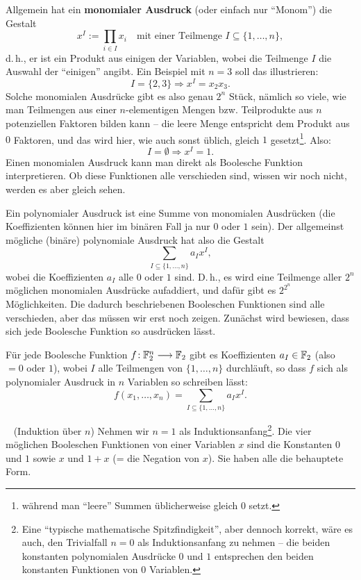 \begin{refsegment}
Allgemein hat ein \textbf{monomialer Ausdruck}
(oder einfach nur "`Monom"') die Gestalt
\[
    x^I := \prod_{i \in I} x_i
     \quad\text{mit einer Teilmenge } I \subseteq \{1, \ldots, n\},
\]
d.\,h., er ist ein Produkt aus einigen der Variablen, wobei die Teilmenge
$I$ die Auswahl der "`einigen"' angibt. Ein Beispiel mit $n = 3$
soll das illustrieren:
\[
      I = \{2, 3\} \Longrightarrow x^I = x_2 x_3.
\]
Solche monomialen
Ausdrücke gibt es also genau $2^n$ Stück, nämlich so viele, wie man
Teilmengen aus einer $n$-elementigen Mengen bzw.
Teilprodukte aus $n$ potenziellen Faktoren bilden kann -- die leere
Menge entspricht dem Produkt aus $0$ Faktoren, und das wird hier, wie
auch sonst üblich, gleich $1$ gesetzt\footnote{%
  während man "`leere"' Summen üblicherweise gleich $0$ setzt.
}.
Also:
\[
      I = \emptyset \Longrightarrow x^I = 1.
\]
Einen monomialen Ausdruck kann man direkt als Boolesche
Funktion
interpretieren. Ob diese Funktionen alle verschieden
sind, wissen wir noch nicht, werden es aber gleich sehen.

Ein polynomialer
Ausdruck ist eine Summe von monomialen Ausdrücken
(die Koeffizienten können hier im binären Fall ja nur $0$ oder $1$
sein). Der allgemeinst mögliche (binäre) polynomiale Ausdruck
hat also die Gestalt
\[
     \sum_{I \subseteq \{1,\ldots,n\}} a_I x^I,
\]
wobei die Koeffizienten $a_I$ alle $0$ oder $1$ sind. D.\,h., es wird
eine Teilmenge aller $2^n$ möglichen monomialen Ausdrücke aufaddiert, und
dafür gibt es $2^{2^n}$ Möglichkeiten. Die dadurch beschriebenen
Booleschen Funktionen sind alle verschieden, aber das müssen wir
erst noch zeigen. Zunächst wird bewiesen, dass sich jede Boolesche
Funktion so ausdrücken lässt.

\begin{satz}[ANF]\label{thm-bool-anf1}
  Für jede Boolesche
  Funktion $f\!: \mathbb{F}_2^n \longrightarrow \mathbb{F}_2$
  gibt es Koeffizienten $a_I \in \mathbb{F}_2$ (also $= 0$ oder $1$),
  wobei $I$ alle Teilmengen von $\{1, \ldots, n\}$ durchläuft, so dass
  $f$ sich als polynomialer
  Ausdruck in $n$ Variablen so schreiben lässt:
\begin{equation}\label{eq-bool-anf}
  f(x_1,\ldots,x_n) = \sum_{I \subseteq \{1,\ldots,n\}} a_I x^I.
\end{equation}
\end{satz}
\begin{Beweis}~
   (Induktion über $n$) Nehmen wir $n = 1$ als Induktionsanfang\footnote{%
   Eine "`typische mathematische Spitzfindigkeit"', aber dennoch korrekt,
   wäre es auch, den Trivialfall $n = 0$ als Induktionsanfang zu nehmen --
   die beiden konstanten polynomialen Ausdrücke $0$ und $1$ entsprechen
   den beiden konstanten Funktionen von $0$ Variablen.
   }.
   Die vier möglichen Booleschen Funktionen von einer Variablen $x$ sind die
   Konstanten $0$ und $1$ sowie $x$ und $1+x$ (= die Negation von $x$).
   Sie haben alle die behauptete Form.


\end{Beweis}
\end{refsegment}
